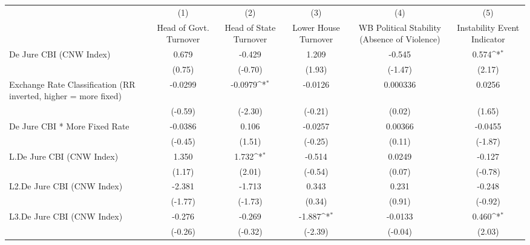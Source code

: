 {
\def\sym#1{\ifmmode^{#1}\else\(^{#1}\)\fi}
\begin{tabular*}{\linewidth}{@{\hskip\tabcolsep\extracolsep\fill}l*{5}{c}}
\toprule
                &\multicolumn{1}{c}{(1)}&\multicolumn{1}{c}{(2)}&\multicolumn{1}{c}{(3)}&\multicolumn{1}{c}{(4)}&\multicolumn{1}{c}{(5)}\\
                &\multicolumn{1}{c}{Head of Govt. Turnover}&\multicolumn{1}{c}{Head of State Turnover}&\multicolumn{1}{c}{Lower House Turnover}&\multicolumn{1}{c}{WB Political Stability (Absence of Violence)}&\multicolumn{1}{c}{Instability Event Indicator}\\
\midrule
De Jure CBI (CNW Index)&    0.679         &   -0.429         &    1.209         &   -0.545         &    0.574\sym{*}  \\
                &   (0.75)         &  (-0.70)         &   (1.93)         &  (-1.47)         &   (2.17)         \\
\addlinespace
Exchange Rate Classification (RR inverted, higher = more fixed)&  -0.0299         &  -0.0979\sym{*}  &  -0.0126         & 0.000336         &   0.0256         \\
                &  (-0.59)         &  (-2.30)         &  (-0.21)         &   (0.02)         &   (1.65)         \\
\addlinespace
De Jure CBI * More Fixed Rate&  -0.0386         &    0.106         &  -0.0257         &  0.00366         &  -0.0455         \\
                &  (-0.45)         &   (1.51)         &  (-0.25)         &   (0.11)         &  (-1.87)         \\
\addlinespace
L.De Jure CBI (CNW Index)&    1.350         &    1.732\sym{*}  &   -0.514         &   0.0249         &   -0.127         \\
                &   (1.17)         &   (2.01)         &  (-0.54)         &   (0.07)         &  (-0.78)         \\
\addlinespace
L2.De Jure CBI (CNW Index)&   -2.381         &   -1.713         &    0.343         &    0.231         &   -0.248         \\
                &  (-1.77)         &  (-1.73)         &   (0.34)         &   (0.91)         &  (-0.92)         \\
\addlinespace
L3.De Jure CBI (CNW Index)&   -0.276         &   -0.269         &   -1.887\sym{*}  &  -0.0133         &    0.460\sym{*}  \\
                &  (-0.26)         &  (-0.32)         &  (-2.39)         &  (-0.04)         &   (2.03)         \\

\end{tabular*}}

